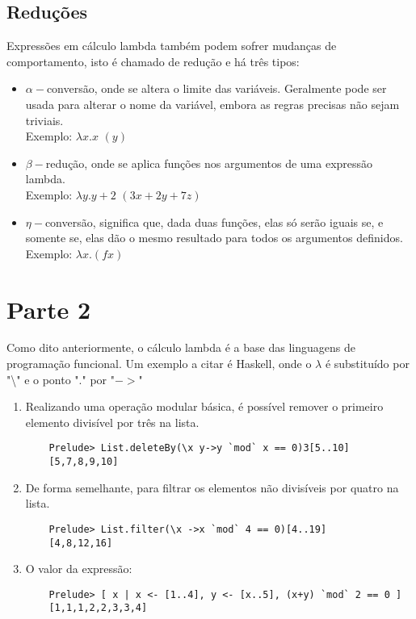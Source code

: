 \documentclass{article}
\begin{document}
\newpage
\subsection*{Reduções}
Expressões em cálculo lambda também podem sofrer mudanças de comportamento, isto é chamado de redução e há três tipos:
    \begin{itemize}
        \item $\alpha-$conversão, onde se altera o limite das variáveis. Geralmente pode ser usada para alterar o nome da variável, embora as regras precisas não sejam triviais. \\
        Exemplo: $\lambda x.x$ $(y)$
        \item $\beta-$redução, onde se aplica funções nos argumentos de uma expressão lambda. \\ 
        Exemplo: $\lambda y.y +2$ $(3x+2y+7z)$
        \item $\eta-$conversão, significa que, dada duas funções, elas só serão iguais se, e somente se, elas dão o mesmo resultado para todos os argumentos definidos. \\
        Exemplo: $\lambda x.(f x)$
    \end{itemize}
    
\section*{Parte 2}
Como dito anteriormente, o cálculo lambda é a base das linguagens de programação funcional. Um exemplo a citar é Haskell, onde o $\lambda$ é substituído por "\textbackslash" e o ponto "." por "$->$"
\begin{enumerate}
    \item Realizando uma operação modular básica, é possível remover o primeiro elemento divisível por três na lista.
    \begin{verbatim}
    Prelude> List.deleteBy(\x y->y `mod` x == 0)3[5..10]
    [5,7,8,9,10]
    \end{verbatim}
    \item De forma semelhante, para filtrar os elementos não divisíveis por quatro na lista.
    \begin{verbatim}
    Prelude> List.filter(\x ->x `mod` 4 == 0)[4..19]
    [4,8,12,16]
    \end{verbatim}
    \item O valor da expressão:
    \begin{verbatim}
    Prelude> [ x | x <- [1..4], y <- [x..5], (x+y) `mod` 2 == 0 ]
    [1,1,1,2,2,3,3,4]
    \end{verbatim}
\end{enumerate}
\end{document}
